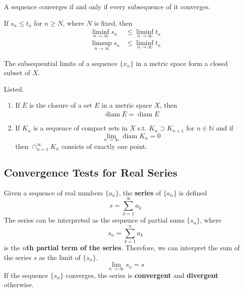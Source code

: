\documentclass{article}
\DeclareMathOperator{\diam}{diam}
\begin{document}
    \begin{corollary}
      A sequence converges if and only if every subsequence of it converges. 
    \end{corollary}

    \begin{theorem}
      If $s_n \leq t_n$ for $n \geq N$, where $N$ is fixed, then 
      \begin{align*}
        \liminf_{n \rightarrow \infty} s_n & \leq \liminf_{n \rightarrow \infty} t_n \\
        \limsup_{n \rightarrow \infty} s_n & \leq \liminf_{n \rightarrow \infty} t_n 
      \end{align*}
    \end{theorem}

    \begin{theorem}
      The subsequential limits of a sequence $\{x_n\}$ in a metric space form a closed subset of $X$. 
    \end{theorem}

    \begin{theorem}
      Listed. 
      \begin{enumerate}
        \item If $\overline{E}$ is the closure of a set $E$ in a metric space $X$, then 
        \[\diam{\overline{E}} = \diam{E}\]

        \item If $K_n$ is a sequence of compact sets in $X$ s.t. $K_n \supset K_{n+1}$ for $n \in \mathbb{N}$ and if 
        \[\lim_{n \rightarrow \infty} \diam{K_n} = 0\]
        then $\cap_{n=1}^\infty K_n$ consists of exactly one point. 
      \end{enumerate}
    \end{theorem}
    
  \subsection{Convergence Tests for Real Series}

    \begin{definition}
      Given a sequence of real numbers $\{a_n\}$, the \textbf{series} of $\{a_n\}$ is defined
      \begin{equation}
        s = \sum_{k=1}^\infty a_k
      \end{equation}
      The series can be interpreted as the sequence of partial sums $\{s_n\}$, where
      \begin{equation}
        s_n = \sum_{k=1}^n a_k
      \end{equation}
      is the \textbf{$n$th partial term of the series}. Therefore, we can interpret the sum of the series $s$ as the limit of $\{s_n\}$. 
      \begin{equation}
        \lim_{n \rightarrow \infty} s_n = s
      \end{equation}
      If the sequence $\{s_n\}$ converges, the series is \textbf{convergent} and \textbf{divergent} otherwise. 
    \end{definition}
\end{document}
